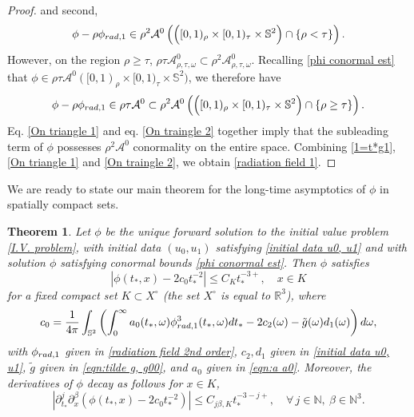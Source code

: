 \documentclass[10pt,a4paper,reqno]{amsart}
\newcommand{\NN}{\mathbb{N}}
\newcommand{\A}{\mathcal{A}}
\newcommand{\pa}{\partial}
\newcommand{\ti}{\tilde}
\renewcommand{\S}{{\mathbb S}}
\newcommand{\p}{\phi}
\newtheorem{theorem}{Theorem}[section]
\theoremstyle{definition}
\theoremstyle{remark}
\numberwithin{equation}{section}
\newcommand{\R}{\mathbb R}
\newcommand{\ts}{t_*}
\begin{document}
\begin{proof}
	and second, 
	\begin{equation}
		\label{On triangle 1}
		\phi - \rho	\phi_{\rm{rad},1} \in \rho^2 \A^0 \left( \Big( [0,1)_\rho \times [0,1)_\tau \times \mathbb{S}^2 \Big) \cap \{\rho<\tau\} \right).
	\end{equation}
However, on the region $\rho\geq \tau$, $\rho\tau\A^0_{\rho,\tau,\omega} \subset \rho^2 \A^0_{\rho,\tau,\omega}$. Recalling \eqref{phi conormal est} that $\phi \in \rho\tau \A^0 ([0,1)_\rho \times [0,1)_\tau \times \mathbb{S}^2)$, we therefore have
	\begin{equation}
		\label{On traingle 2}
		\phi - \rho	\phi_{\rm{rad},1} \in \rho\tau \A^0 \subset \rho^2 \A^0 \left( \Big( [0,1)_\rho \times [0,1)_\tau \times \mathbb{S}^2 \Big) \cap \{\rho\geq\tau\} \right).
	\end{equation}
    Eq. \eqref{On triangle 1} and eq. \eqref{On traingle 2} together imply that the subleading term of $\phi$ possesses $\rho^2 \A^0$ conormality on the entire space.
	Combining \eqref{1=t*g1}, \eqref{On triangle 1} and \eqref{On traingle 2}, we obtain \eqref{radiation field 1}.
\end{proof}

We are ready to state our main theorem for the long-time asymptotics of $\phi$ in spatially compact sets. 

\begin{theorem}\label{thm:compactmain}
Let $\phi$ be the unique forward solution to the initial value problem \eqref{I.V. problem}, with initial data $(u_0,u_1)$ satisfying \eqref{initial data u0, u1} and with solution $\phi$ satisfying conormal bounds \eqref{phi conormal est}. Then $\phi$ satisfies
\begin{equation} 
	|\p(\ts,x) - 2c_0 \ts^{-2}| \leq C_K \ts^{-3+}, \quad x \in K
\end{equation}
for a fixed compact set $K \subset X^\circ$ (the set $X^\circ$ is equal to $\R^3$), where
\begin{equation}
\label{eq:leadcoefficient}
    c_0 = \frac{1}{4\pi}\int_{\S^2} \left(\int_0^\infty a_0(\ts,\omega)\phi_{\rm{rad},1}^3(\ts,\omega) d\ts - 2c_2(\omega)-\ti{g}(\omega)d_1(\omega)\right) d\omega ,
\end{equation}
with $\phi_{\rm rad,1}$ given in \eqref{radiation field 2nd order}, $c_2, d_1$ given in \eqref{initial data u0, u1}, $\tilde{g}$ given in \eqref{eqn:tilde g, g00}, and $a_0$ given in \eqref{eqn:a a0}. 
Moreover, the derivatives of $\phi$ decay as follows for $x\in K$,
\begin{equation}
\label{phi asymp spatial compact}
	|\pa_{\ts}^j \pa_x^\beta (\phi(\ts,x)-2c_0\ts^{-2})| \leq C_{j\beta,K} \ts^{-3-j+},\quad\forall\,j\in\NN,\ \beta\in\NN^3.
\end{equation}
\end{theorem}
\end{document}
